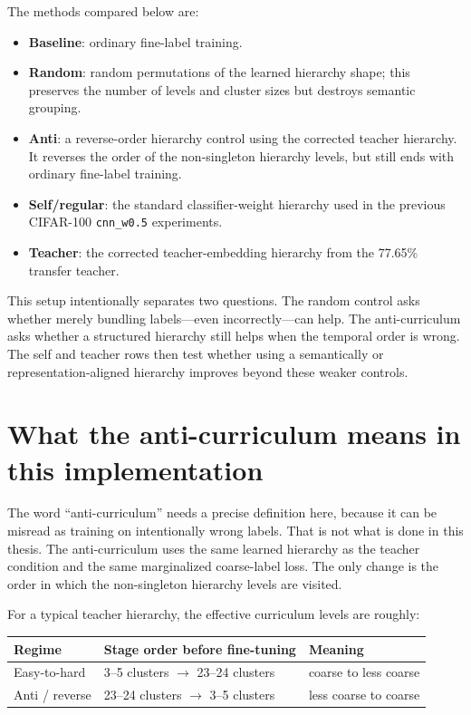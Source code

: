 The methods compared below are:

\begin{itemize}
    \item \textbf{Baseline}: ordinary fine-label training.
    \item \textbf{Random}: random permutations of the learned hierarchy shape;
          this preserves the number of levels and cluster sizes but destroys
          semantic grouping.
    \item \textbf{Anti}: a reverse-order hierarchy control using the corrected
          teacher hierarchy. It reverses the order of the non-singleton hierarchy
          levels, but still ends with ordinary fine-label training.
    \item \textbf{Self/regular}: the standard classifier-weight hierarchy used
          in the previous CIFAR-100 \texttt{cnn\_w0.5} experiments.
    \item \textbf{Teacher}: the corrected teacher-embedding hierarchy from the
          77.65\% transfer teacher.
\end{itemize}

This setup intentionally separates two questions. The random control asks
whether merely bundling labels---even incorrectly---can help. The anti-curriculum
asks whether a structured hierarchy still helps when the temporal order is wrong.
The self and teacher rows then test whether using a semantically or
representation-aligned hierarchy improves beyond these weaker controls.

\section{What the anti-curriculum means in this implementation}

The word ``anti-curriculum'' needs a precise definition here, because it can be
misread as training on intentionally wrong labels. That is not what is done in
this thesis. The anti-curriculum uses the same learned hierarchy as the teacher
condition and the same marginalized coarse-label loss. The only change is the
order in which the non-singleton hierarchy levels are visited.

For a typical teacher hierarchy, the effective curriculum levels are roughly:

\begin{center}
\begin{tabular}{lll}
\hline
Regime & Stage order before fine-tuning & Meaning \\
\hline
Easy-to-hard & 3--5 clusters $\rightarrow$ 23--24 clusters & coarse to less coarse \\
Anti / reverse & 23--24 clusters $\rightarrow$ 3--5 clusters & less coarse to coarse \\
\hline
\end{tabular}
\end{center}

